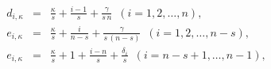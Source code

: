 \begin{equation}
\begin{array}{rcl}
d_{i,\kappa}&=&\frac{\kappa}{s}+\frac{i-1}{s}+\frac{\gamma}{s\,n} \,\,\,
(i=1,2,\dots,n),\\
e_{i,\kappa}&=&\frac{\kappa}{s}+\frac{i}{n-s}+\frac{\gamma}{s\,(n-s)} \,\,\,
(i=1,2,\dots,n-s),\\
e_{i,\kappa}&=&\frac{\kappa}{s}+1+\frac{i-n}{s}+\frac{\delta_{i}}{s} \,\,\,
(i=n-s+1,\dots,n-1),
\end{array}
\end{equation}

